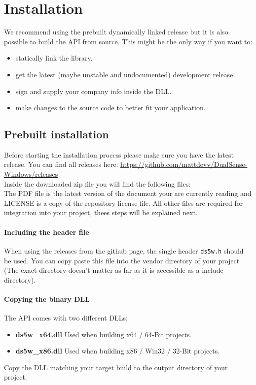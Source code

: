 \section{Installation}
We recommend using the prebuilt dynamically linked release but it is also possible to build the API from source. This might be the only way if you want to:
\begin{itemize}
	\item statically link the library.
	\item get the latest (maybe unstable and undocumented) development release.
	\item sign and supply your company info inside the DLL.
	\item make changes to the source code to better fit your application.
\end{itemize}

\subsection{Prebuilt installation}
Before starting the installation process please make sure you have the latest release. You can find all releases here: \url{https://github.com/mattdevv/DualSense-Windows/releases}\\

Inside the downloaded zip file you will find the following files:
~\\

The PDF file is the latest version of the document your are currently reading and LICENSE is a copy of the repository license file. All other files are required for integration into your project, thees steps will be explained next.

\paragraph{Including the header file}
When using the releases from the github page, the single header \texttt{ds5w.h} should be used. You can copy paste this file into the vendor directory of your project (The exact directory doesn't matter as far as it is accessible as a include directory). 

\paragraph{Copying the binary DLL}
The API comes with two different DLLs:
\begin{itemize}
	\item \textbf{ds5w\_x64.dll} Used when building x64 / 64-Bit projects.
	\item \textbf{ds5w\_x86.dll} Used when building x86 / Win32 / 32-Bit projects.
\end{itemize}
Copy the DLL matching your target build to the output directory of your project.

